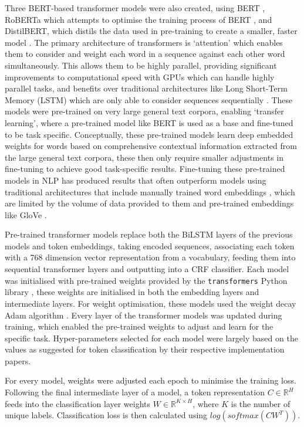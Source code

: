 \documentclass[]{interact}
\theoremstyle{plain}%
\theoremstyle{definition}
\theoremstyle{remark}
\begin{document}
Three BERT-based transformer models were also created, using BERT
\citep{devlin2019}, RoBERTa which attempts to optimise the training
process of BERT \citep{liu2019}, and DistilBERT, which distils the data
used in pre-training to create a smaller, faster model \citep{sanh2020}.
The primary architecture of transformers is `attention' which enables
them to consider and weight each word in a sequence against each other
word simultaneously. This allows them to be highly parallel, providing
significant improvements to computational speed with GPUs which can
handle highly parallel tasks, and benefits over traditional
architectures like Long Short-Term Memory (LSTM) which are only able to
consider sequences sequentially \citep{vaswani2017}. These models were
pre-trained on very large general text corpora, enabling `transfer
learning', where a pre-trained model like BERT is used as a base and
fine-tuned to be task specific. Conceptually, these pre-trained models
learn deep embedded weights for words based on comprehensive contextual
information extracted from the large general text corpora, these then
only require smaller adjustments in fine-tuning to achieve good
task-specific results. Fine-tuning these pre-trained models in NLP has
produced results that often outperform models using traditional
architectures that include manually trained word embeddings
\citep[Word2Vec,][]{mikolov2013}, which are limited by the volume of
data provided to them and pre-trained embeddings like GloVe
\citep{pennington2014}.

Pre-trained transformer models replace both the BiLSTM layers of the
previous models and token embeddings, taking encoded sequences,
associating each token with a 768 dimension vector representation from a
vocabulary, feeding them into sequential transformer layers and
outputting into a CRF classifier. Each model was initialised with
pre-trained weights provided by the \texttt{transformers} Python library
\citep{wolf2020}, these weights are initialised in both the embedding
layers and intermediate layers. For weight optimisation, these models
used the weight decay Adam algorithm
\citep[\texttt{AdamW},][]{loshchilov2019}. Every layer of the
transformer models was updated during training, which enabled the
pre-trained weights to adjust and learn for the specific task.
Hyper-parameters selected for each model were largely based on the
values as suggested for token classification by their respective
implementation papers.

For every model, weights were adjusted each epoch to minimise the
training loss. Following the final intermediate layer of a model, a
token representation \(C\in\mathbb{R}^H\) feeds into the classification
layer weights \(W\in\mathbb{R}^{K\times H}\), where \(K\) is the number
of unique labels. Classification loss is then calculated using
\(log(softmax(CW^T))\).
\end{document}
